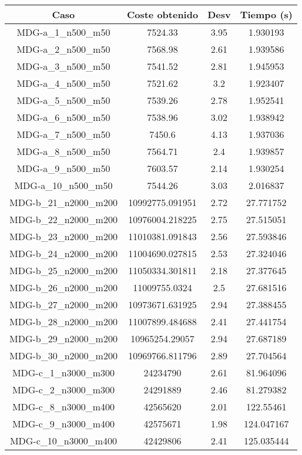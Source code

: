 \documentclass{article}
\begin{document}
\begin{table}[H]
	\centering
	\begin{tabular}{|cccc|}
		\hline
		Caso & Coste obtenido & Desv & Tiempo (s)\\ \hline
		MDG-a\_1\_n500\_m50 & 7524.33 & 3.95 & 1.930193\\
		MDG-a\_2\_n500\_m50 & 7568.98 & 2.61 & 1.939586\\
		MDG-a\_3\_n500\_m50 & 7541.52 & 2.81 & 1.945953\\
		MDG-a\_4\_n500\_m50 & 7521.62 & 3.2 & 1.923407\\
		MDG-a\_5\_n500\_m50 & 7539.26 & 2.78 & 1.952541\\
		MDG-a\_6\_n500\_m50 & 7538.96 & 3.02 & 1.938942\\
		MDG-a\_7\_n500\_m50 & 7450.6 & 4.13 & 1.937036\\
		MDG-a\_8\_n500\_m50 & 7564.71 & 2.4 & 1.939857\\
		MDG-a\_9\_n500\_m50 & 7603.57 & 2.14 & 1.930254\\
		MDG-a\_10\_n500\_m50 & 7544.26 & 3.03 & 2.016837\\
		MDG-b\_21\_n2000\_m200 & 10992775.091951 & 2.72 & 27.771752\\
		MDG-b\_22\_n2000\_m200 & 10976004.218225 & 2.75 & 27.515051\\
		MDG-b\_23\_n2000\_m200 & 11010381.091843 & 2.56 & 27.593846\\
		MDG-b\_24\_n2000\_m200 & 11004690.027815 & 2.53 & 27.324046\\
		MDG-b\_25\_n2000\_m200 & 11050334.301811 & 2.18 & 27.377645\\
		MDG-b\_26\_n2000\_m200 & 11009755.0324 & 2.5 & 27.681516\\
		MDG-b\_27\_n2000\_m200 & 10973671.631925 & 2.94 & 27.388455\\
		MDG-b\_28\_n2000\_m200 & 11007899.484688 & 2.41 & 27.441754\\
		MDG-b\_29\_n2000\_m200 & 10965254.29057 & 2.94 & 27.687189\\
		MDG-b\_30\_n2000\_m200 & 10969766.811796 & 2.89 & 27.704564\\
		MDG-c\_1\_n3000\_m300 & 24234790 & 2.61 & 81.964096\\
		MDG-c\_2\_n3000\_m300 & 24291889 & 2.46 & 81.279382\\
		MDG-c\_8\_n3000\_m400 & 42565620 & 2.01 & 122.55461\\
		MDG-c\_9\_n3000\_m400 & 42575671 & 1.98 & 124.047167\\
		MDG-c\_10\_n3000\_m400 & 42429806 & 2.41 & 125.035444\\

\end{tabular}
\end{table}
\end{document}
